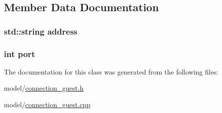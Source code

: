 \subsection{Member Data Documentation}
\subsubsection[{\texorpdfstring{address}{address}}]{\setlength{\rightskip}{0pt plus 5cm}std\+::string address\hspace{0.3cm}{\ttfamily [private]}}\hypertarget{classMODEL_1_1ConnectionGuest_a8b6f74419f28d6b9d96568f2f1087c3e}{}\label{classMODEL_1_1ConnectionGuest_a8b6f74419f28d6b9d96568f2f1087c3e}
\subsubsection[{\texorpdfstring{port}{port}}]{\setlength{\rightskip}{0pt plus 5cm}int port\hspace{0.3cm}{\ttfamily [private]}}\hypertarget{classMODEL_1_1ConnectionGuest_a63c89c04d1feae07ca35558055155ffb}{}\label{classMODEL_1_1ConnectionGuest_a63c89c04d1feae07ca35558055155ffb}


The documentation for this class was generated from the following files\+:\begin{DoxyCompactItemize}
\item 
model/\hyperlink{connection__guest_8h}{connection\+\_\+guest.\+h}\item 
model/\hyperlink{connection__guest_8cpp}{connection\+\_\+guest.\+cpp}\end{DoxyCompactItemize}
